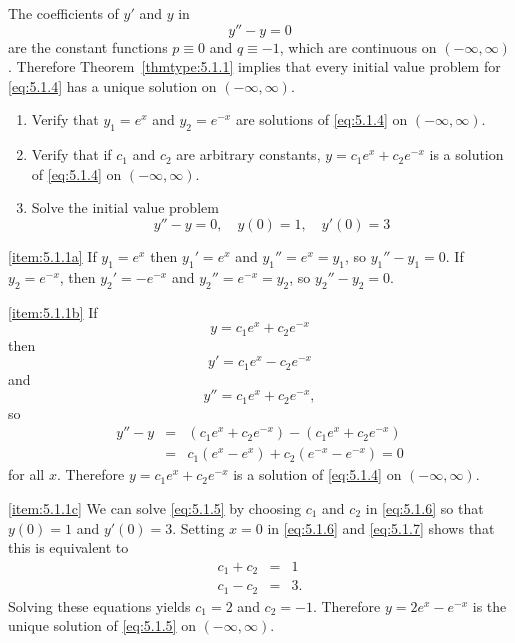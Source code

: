 \documentclass{ximera}
\begin{document}
\begin{example}\label{example:5.1.1} 
The coefficients of $y'$ and $y$ in
\begin{equation}\label{eq:5.1.4}
y''-y=0
\end{equation}
are the constant functions $p\equiv0$ and $q\equiv-1$, which are
continuous on $(-\infty,\infty)$. Therefore Theorem~\ref{thmtype:5.1.1}
implies that every initial value problem for \eqref{eq:5.1.4}  has a
unique solution on $(-\infty,\infty)$.
 
\begin{enumerate}
\item \label{item:5.1.1a} %
Verify that $y_1=e^x$ and $y_2=e^{-x}$ are solutions of
\eqref{eq:5.1.4} on $(-\infty,\infty)$.
\item \label{item:5.1.1b}%
Verify that if $c_1$ and $c_2$ are arbitrary constants,
$y=c_1e^x+c_2e^{-x}$ is a solution of \eqref{eq:5.1.4} on
$(-\infty,\infty)$.
\item \label{item:5.1.1c}%
Solve the initial value problem
\begin{equation}\label{eq:5.1.5}
y''-y=0,\quad y(0)=1,\quad y'(0)=3
\end{equation}
\end{enumerate}
\begin{explanation}
 
\ref{item:5.1.1a} If $y_1=e^x$ then $y_1'=e^x$ and $y_1''=e^x=y_1$,
so  $y_1''-y_1=0$.
If $y_2=e^{-x}$, then $y_2'=-e^{-x}$ and $y_2''=e^{-x}=y_2$,
so  $y_2''-y_2=0$.
 
\ref{item:5.1.1b} If
\begin{equation}\label{eq:5.1.6}
y=c_1e^x+c_2e^{-x}
\end{equation}
 then
\begin{equation}\label{eq:5.1.7}
y'=c_1e^x-c_2e^{-x}
\end{equation}
and
$$
y''=c_1e^x+c_2e^{-x},
$$
 so
\begin{eqnarray*}
y''-y&=&(c_1e^x+c_2e^{-x})-(c_1e^x+c_2e^{-x})\\
&=&c_1(e^x-e^x)+c_2(e^{-x}-e^{-x})=0
\end{eqnarray*}
for all $x$. Therefore $y=c_1e^x+c_2e^{-x}$ is a solution of
\eqref{eq:5.1.4} on $(-\infty,\infty)$.
 
\ref{item:5.1.1c}
We can solve \eqref{eq:5.1.5} by choosing $c_1$ and $c_2$ in \eqref{eq:5.1.6}
so that $y(0)=1$ and $y'(0)=3$. Setting $x=0$ in \eqref{eq:5.1.6} and
\eqref{eq:5.1.7} shows that this is equivalent to
\begin{eqnarray*}
c_1+c_2&=&1\\
c_1-c_2&=&3.
\end{eqnarray*}
Solving these equations yields  $c_1=2$  and $c_2=-1$.
Therefore $y=2e^x-e^{-x}$ is the unique solution of
\eqref{eq:5.1.5} on $(-\infty,\infty)$.


\end{explanation}
\end{example}
\end{document}
